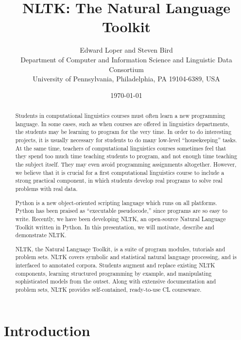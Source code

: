 \documentclass[11pt]{article}
\title{NLTK: The Natural Language Toolkit}
\author{
Edward Loper and Steven Bird\\
Department of Computer and Information Science and Linguistic Data Consortium\\
University of Pennsylvania, Philadelphia, PA 19104-6389, USA
}
\date{\today}
\begin{document}
\makeidpage
\maketitle

\begin{abstract}
Students in computational linguistics courses must often learn a new
programming language.  In some cases, such as when courses are offered
in linguistics departments, the students may be learning to program
for the very time.  In order to do interesting projects, it is usually
necessary for students to do many low-level ``housekeeping'' tasks.
At the same time, teachers of computational linguistics courses
sometimes feel that they spend too much time teaching students to
program, and not enough time teaching the subject itself.  They may
even avoid programming assignments altogether.  However, we believe
that it is crucial for a first computational linguistics course to
include a strong practical component, in which students develop real
programs to solve real problems with real data.

Python is a new object-oriented scripting language which runs on all
platforms.  Python has been praised as ``executable pseudocode,'' since
programs are so easy to write.  Recently, we have been developing
NLTK, an open-source Natural Language Toolkit written in Python.
In this presentation, we will motivate, describe and demonstrate NLTK.

NLTK, the Natural Language Toolkit, is a suite of program modules,
tutorials and problem sets.  NLTK covers symbolic and statistical
natural language processing, and is interfaced to annotated corpora.
Students augment and replace existing NLTK components, learning
structured programming by example, and manipulating sophisticated
models from the outset.  Along with extensive documentation and
problem sets, NLTK provides self-contained, ready-to-use CL
courseware.
\end{abstract}

\section{Introduction}
\end{document}
